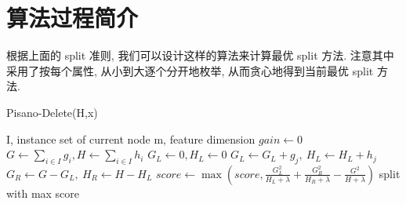 \documentclass[UTF8]{article}
\begin{document}
\section{算法过程简介}
\noindent 根据上面的 split 准则, 我们可以设计这样的算法来计算最优 split 方法. 注意其中采用了按每个属性, 从小到大逐个分开地枚举, 从而贪心地得到当前最优 split 方法.
\begin{algorithm}[H]
	\caption{{\sc Pisano-Delete}(H,x)}
	\begin{algorithmic}[1] %
		\Require I, instance set of current node
		\Require m, feature dimension
		\State $gain \leftarrow 0$
		\State $G \leftarrow \sum_{i\in I}g_i, H \leftarrow \sum_{i\in I}h_i $
			\State $G_L\leftarrow 0, H_L\leftarrow 0$
				\State $G_L\leftarrow G_L+g_j,\ H_L\leftarrow H_L+h_j$
				\State $G_R\leftarrow G-G_L,\ H_R\leftarrow H-H_L$
				\State $score \leftarrow \max\left(score, \frac{G_L^2}{H_L+\lambda}+\frac{G_R^2}{H_R+\lambda}-\frac{G^2}{H+\lambda}\right)$
			\EndFor
		\EndFor
		\State \Return split with max score
	\end{algorithmic}
\end{algorithm}
\end{document}
